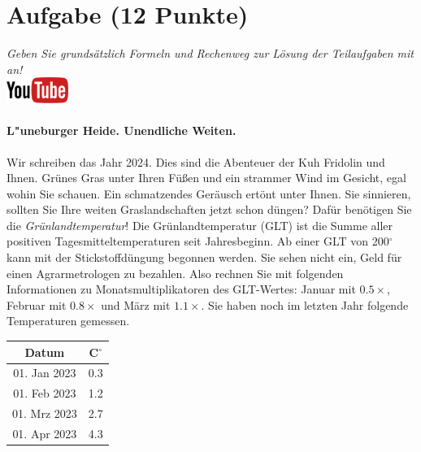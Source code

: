 \documentclass[a4paper, 9pt]{scrartcl}\usepackage[]{graphicx}\usepackage[]{xcolor}
\begin{document}
\clearpage

\section{Aufgabe \hfill (12 Punkte)}

\textit{Geben Sie grunds{\"a}tzlich Formeln und Rechenweg zur L{\"o}sung der
  Teilaufgaben mit an!} \\[1Ex]

\hfill\href{https://youtu.be/fiWGgCX-cE4}{\includegraphics[width =
  2cm]{img/youtube}} %
\hspace{2Ex}



\paragraph{L{"u}neburger Heide. Unendliche Weiten.}



Wir schreiben das Jahr 2024. Dies sind die Abenteuer
der Kuh Fridolin und Ihnen. Gr{\"u}nes Gras unter Ihren F{\"u}{\ss}en und
ein strammer Wind im Gesicht, egal wohin Sie schauen. Ein schmatzendes
Ger{\"a}usch ert{\"o}nt unter Ihnen. Sie sinnieren, sollten Sie Ihre weiten
Graslandschaften jetzt schon d{\"u}ngen?  Daf{\"u}r ben{\"o}tigen Sie die
\textit{Gr{\"u}nlandtemperatur}! Die Gr{\"u}nlandtemperatur (GLT) ist die Summe aller
positiven Tagesmitteltemperaturen seit Jahresbeginn. Ab einer GLT von
200$^\circ$ kann mit der Stickstoffd{\"u}ngung begonnen werden. Sie sehen nicht
ein, Geld f{\"u}r einen Agrarmetrologen zu bezahlen. Also rechnen Sie mit
folgenden Informationen zu Monatsmultiplikatoren des GLT-Wertes: Januar mit
$0.5\times$, Februar mit $0.8\times$ und M{\"a}rz mit
$1.1\times$. Sie haben noch im letzten Jahr folgende Temperaturen
gemessen.

\begin{center}
\begin{tabular}{cc}
  \toprule
  Datum & C$^\circ$ \\
  \midrule
  01. Jan 2023 & 0.3\\
  01. Feb 2023 & 1.2\\
  01. Mrz 2023 & 2.7\\
  01. Apr 2023 & 4.3\\
  \bottomrule
\end{tabular}
\end{center}
\end{document}
